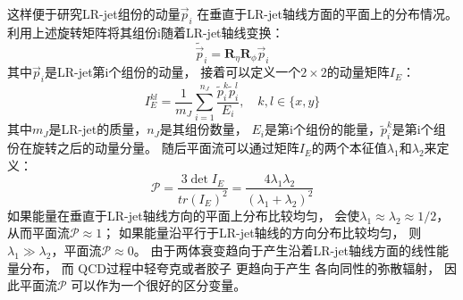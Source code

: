 这样便于研究LR-jet组份的动量$\vec{p}_i$
在垂直于LR-jet轴线方面的平面上的分布情况。
利用上述旋转矩阵将其组份i随着LR-jet轴线变换：
\begin{equation} 
\label{eq:JSS11}
\tilde{\vec{p}}_i=\mathbf{R}_{\eta}\mathbf{R}_{\phi}\vec{p}_i
\end{equation}
其中$\vec{p}_i$是LR-jet第i个组份的动量，
接着可以定义一个$2\times 2$的动量矩阵$I_E$：
\begin{equation} 
\label{eq:JSS12}
I_E^{kl}=\frac{1}{m_J} \sum_{i=1}^{n_J} \frac{\tilde{p}_i^k\tilde{p}_i^l}{E_i}, \quad k,l \in \{x,y\}
\end{equation}
其中$m_J$是LR-jet的质量，$n_J$是其组份数量，
$E_i$是第i个组份的能量，$\tilde{p}_i^k$是第i个组份在旋转之后的动量分量。
随后平面流可以通过矩阵$I_E$的两个本征值$\lambda_1$和$\lambda_2$来定义：
\begin{equation} 
\label{eq:JSS13}
\mathcal{P}=\frac{3\det{I_E}}{tr(I_E)^2}=\frac{4\lambda_1\lambda_2}{(\lambda_1+\lambda_2)^2}
\end{equation}
如果能量在垂直于LR-jet轴线方向的平面上分布比较均匀，
会使$\lambda_1\approx\lambda_2\approx 1/2$，从而平面流$\mathcal{P}\approx 1$；
如果能量沿平行于LR-jet轴线的方向分布比较均匀，
则$\lambda_1\gg \lambda_2$，平面流$\mathcal{P}\approx 0$。
由于两体衰变趋向于产生沿着LR-jet轴线方面的线性能量分布，
而
QCD过程中轻夸克或者胶子
更趋向于产生
各向同性的弥散辐射，
因此平面流$\mathcal{P}$
可以作为一个很好的区分变量。










































